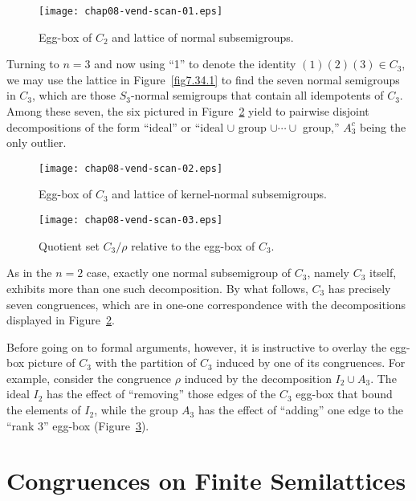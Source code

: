 \documentclass{surv-l}
\numberwithin{equation}{section}
\numberwithin{table}{section}
\numberwithin{figure}{section}
\theoremstyle{definition}
\begin{document}
\begin{figure}[!h]
\texttt{[image: chap08-vend-scan-01.eps]}
\caption{Egg-box of $C_{2}$ and lattice of normal subsemigroups.\label{fig8.36.1}}
\end{figure}

\setcounter{footnote}{0}

Turning to $n =3$ and now using ``1'' to denote the identity
$(1)(2)(3)\in C_{3}$, we may use the lattice in
Figure~\ref{fig7.34.1} to find the seven normal semigroups in
$C_{3}$, which are those $S_{3}$-normal semigroups that contain
all idempotents of $C_{3}$. Among these seven, the six pictured in
Figure~\ref{fig8.36.2} yield to pairwise disjoint decompositions
of the form ``ideal'' or ``ideal $\cup$ group $\cup\cdots\cup$
group,'' $A_{3}^{c}$ being the only outlier.

\setcounter{figure}{1}
\begin{figure}[!h]
\texttt{[image: chap08-vend-scan-02.eps]}
\caption{Egg-box of $C_{3}$ and lattice of kernel-normal subsemigroups.\label{fig8.36.2}}
\end{figure}

\begin{figure}[!h]
\texttt{[image: chap08-vend-scan-03.eps]}
\caption{Quotient set $C_{3}/\rho$ relative to the egg-box of $C_{3}$.\label{fig8.36.3}}
\end{figure}

As in the $n=2$ case, exactly one normal subsemigroup of $C_{3}$,
namely $C_{3}$ itself, exhibits more than one such decomposition.
By what follows, $C_{3}$ has precisely seven congruences, which
are in one-one correspondence with the decompositions displayed in
Figure~\ref{fig8.36.2}.

Before going on to formal arguments, however, it is instructive to
overlay the egg-box picture of $C_{3}$ with the partition of
$C_{3}$ induced by one of its congruences. For
example, consider the congruence $\rho$ induced by the
decomposition $I_{2}\cup A_{3}$. The ideal $I_{2}$ has the effect
of ``removing'' those edges of the $C_{3}$ egg-box that bound the
elements of $I_{2}$, while the group $A_{3}$ has the effect of
``adding'' one edge to the ``rank 3'' egg-box
(Figure~\ref{fig8.36.3}).

\section{Congruences on Finite Semilattices}\label{sec8.37}
\end{document}
